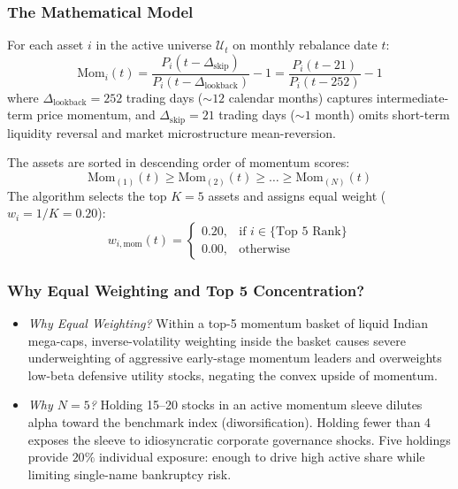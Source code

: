 \documentclass[11pt,a4paper]{article}
\begin{document}
\subsubsection{The Mathematical Model}
For each asset $i$ in the active universe $\mathcal{U}_t$ on monthly rebalance date $t$:
\begin{equation}
\text{Mom}_i(t) = \frac{P_i(t - \Delta_{\text{skip}})}{P_i(t - \Delta_{\text{lookback}})} - 1 = \frac{P_i(t - 21)}{P_i(t - 252)} - 1
\end{equation}
where $\Delta_{\text{lookback}} = 252$ trading days ($\sim 12$ calendar months) captures intermediate-term price momentum, and $\Delta_{\text{skip}} = 21$ trading days ($\sim 1$ month) omits short-term liquidity reversal and market microstructure mean-reversion.

The assets are sorted in descending order of momentum scores:
\begin{equation}
\text{Mom}_{(1)}(t) \ge \text{Mom}_{(2)}(t) \ge \dots \ge \text{Mom}_{(N)}(t)
\end{equation}
The algorithm selects the top $K = 5$ assets and assigns equal weight ($w_i = 1/K = 0.20$):
\begin{equation}
w_{i, \text{mom}}(t) = 
\begin{cases}
0.20, & \text{if } i \in \{\text{Top } 5 \text{ Rank}\} \\
0.00, & \text{otherwise}
\end{cases}
\end{equation}

\subsubsection{Why Equal Weighting and Top 5 Concentration?}
\begin{itemize}[leftmargin=*]
    \item \textit{Why Equal Weighting?} Within a top-5 momentum basket of liquid Indian mega-caps, inverse-volatility weighting inside the basket causes severe underweighting of aggressive early-stage momentum leaders and overweights low-beta defensive utility stocks, negating the convex upside of momentum.
    \item \textit{Why $N = 5$?} Holding 15--20 stocks in an active momentum sleeve dilutes alpha toward the benchmark index (diworsification). Holding fewer than 4 exposes the sleeve to idiosyncratic corporate governance shocks. Five holdings provide $20\%$ individual exposure: enough to drive high active share while limiting single-name bankruptcy risk.
\end{itemize}
\end{document}
